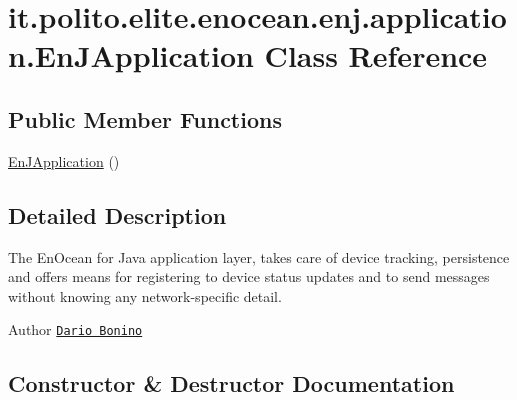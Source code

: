 \hypertarget{classit_1_1polito_1_1elite_1_1enocean_1_1enj_1_1application_1_1_en_j_application}{}\section{it.\+polito.\+elite.\+enocean.\+enj.\+application.\+En\+J\+Application Class Reference}
\label{classit_1_1polito_1_1elite_1_1enocean_1_1enj_1_1application_1_1_en_j_application}
\subsection*{Public Member Functions}
\begin{DoxyCompactItemize}
\item 
\hyperlink{classit_1_1polito_1_1elite_1_1enocean_1_1enj_1_1application_1_1_en_j_application_a1f1ca70e3532ec1c41b3e0e3d6ccb162}{En\+J\+Application} ()
\end{DoxyCompactItemize}


\subsection{Detailed Description}
The En\+Ocean for Java application layer, takes care of device tracking, persistence and offers means for registering to device status updates and to send messages without knowing any network-\/specific detail.

\begin{DoxyAuthor}{Author}
\href{mailto:dario.bonino@gmail.com}{\tt Dario Bonino} 
\end{DoxyAuthor}


\subsection{Constructor \& Destructor Documentation}
\hypertarget{classit_1_1polito_1_1elite_1_1enocean_1_1enj_1_1application_1_1_en_j_application_a1f1ca70e3532ec1c41b3e0e3d6ccb162}{}\label{classit_1_1polito_1_1elite_1_1enocean_1_1enj_1_1application_1_1_en_j_application_a1f1ca70e3532ec1c41b3e0e3d6ccb162} 
